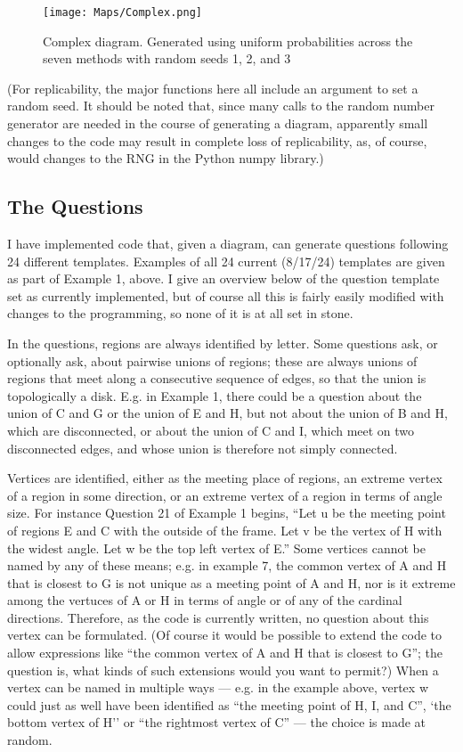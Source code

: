 \documentclass{article}    %
\begin{document}
\begin{figure}
\texttt{[image: Maps/Complex.png]}
\caption{Complex diagram. Generated using uniform probabilities across the
seven methods with random seeds 1, 2, and 3}
\label{figComplex}
\end{figure}

(For replicability, the major functions here all include an argument to
set a random seed. It should be noted that, since many calls to the random
number generator are needed in the course of generating a diagram, apparently
small changes to the code may result in complete loss of replicability, as, 
of course, would changes to the RNG in the Python numpy library.)


\subsection{The Questions}
\label{secQuestions}
I have implemented code that, given a diagram, can generate questions following
24 different templates. Examples of all 24 current (8/17/24) templates
are given as part of Example 1,
above. I give an overview below of the question template set as currently
implemented, but of course all this is fairly easily modified 
with changes to the programming, so none of it is at all set in stone.

In the questions, regions are always identified by letter. Some questions
ask, or optionally ask, about pairwise unions of regions; these are always unions
of regions that meet along a consecutive sequence of edges, so that the
union is topologically a disk. E.g. in Example 1, there could be a question
about the union of C and G or the union of E and H, but not about the union
of B and H, which are disconnected, or about the union of C and I, which meet on
two disconnected edges, and whose union is therefore not simply connected.


Vertices are 
identified, either as the meeting place of regions, 
an extreme vertex of a region in some direction,  
or an extreme vertex of a region in terms of angle size. 
For instance Question 21 of Example 1 begins, 
``Let u be the meeting point of regions E and C with the outside of the 
frame. Let v be the vertex of H with the widest angle. Let w be the top 
left vertex of E.'' Some vertices cannot be named by any of these means; e.g.
in example 7, the common vertex of A and H that is closest to G is not
unique as a meeting point of A and H, nor is it extreme among the vertuces of
A or H in terms of angle or of any of the cardinal directions. Therefore, as
the code is currently written, no question about this vertex can be formulated.
(Of course it would be possible to extend the code to allow expressions like
``the common vertex of A and H that is closest to G''; the question is, what
kinds of such extensions would you want to permit?) When a vertex can be named
in multiple ways --- e.g. in the example above, vertex w could just as well
have been identified as ``the meeting point of H, I, and C'', `the bottom
vertex of H'' or ``the rightmost vertex of C'' --- the choice is made
at random.
\end{document}

